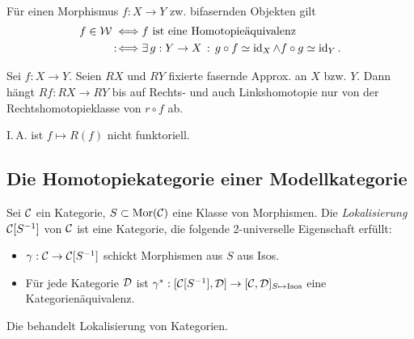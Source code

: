 \documentclass{cheat-sheet}
\newcommand{\Weak}{\mathcal{W}} %
\newcommand{\ModC}{\mathcal{M}} %
\DeclareMathOperator{\Ho}{Ho} %
\begin{document}
\begin{thm}\mbox{}\\
  Für einen Morphismus $f : X \to Y$ zw. bifasernden Objekten gilt
  \begin{align*}
    f \in \Weak \iff & \text{$f$ ist eine Homotopieäquivalenz} \\
    \coloniff & \ex{g : Y \to X} g \circ f \simeq \id_X \wedge f \circ g \simeq \id_Y.
  \end{align*}
\end{thm}

\begin{lem}
  Sei $f : X \to Y$. Seien $RX$ und $RY$ fixierte fasernde Approx. an $X$ bzw. $Y$.
  Dann hängt $Rf : RX \to RY$ bis auf Rechts- und auch Linkshomotopie nur von der Rechtshomotopieklasse von $r \circ f$ ab.
\end{lem}

\begin{acht}
  I.\,A. ist $f \mapsto R(f)$ nicht funktoriell.
\end{acht}

\subsection{Die Homotopiekategorie einer Modellkategorie}



\begin{defn}
  Sei $\mathcal{C}$ ein Kategorie, $S \subset \operatorname{Mor}(\mathcal{C})$ eine Klasse von Morphismen. Die \emph{Lokalisierung} $\mathcal{C}[S^{-1}]$ von $\mathcal{C}$ ist eine Kategorie, die folgende 2-universelle Eigenschaft erfüllt:
  \begin{itemize}
    \item $\gamma : \mathcal{C} \to \mathcal{C}[S^{-1}]$ schickt Morphismen aus $S$ aus Isos.
    \item Für jede Kategorie $\mathcal{D}$ ist $\gamma^* : [\mathcal{C}[S^{-1}], \mathcal{D}] \to [\mathcal{C}, \mathcal{D}]_{S \mapsto \text{Isos}}$ eine Kategorienäquivalenz.
  \end{itemize}
\end{defn}

\begin{bem}
  Die  behandelt Lokalisierung von Kategorien.
\end{bem}
\end{document}
